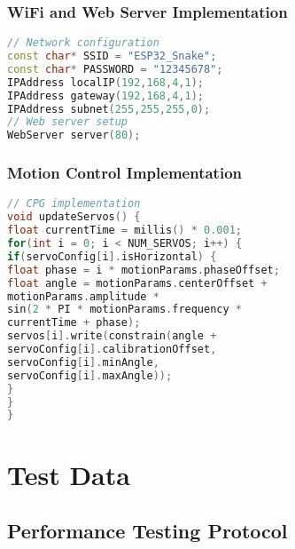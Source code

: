 \documentclass[12pt,a4paper]{report}
\begin{document}
\subsection{WiFi and Web Server Implementation}
\begin{lstlisting}[language=C++]
// Network configuration
const char* SSID = "ESP32_Snake";
const char* PASSWORD = "12345678";
IPAddress localIP(192,168,4,1);
IPAddress gateway(192,168,4,1);
IPAddress subnet(255,255,255,0);
// Web server setup
WebServer server(80);
\end{lstlisting}
\subsection{Motion Control Implementation}
\begin{lstlisting}[language=C++]
// CPG implementation
void updateServos() {
float currentTime = millis() * 0.001;
for(int i = 0; i < NUM_SERVOS; i++) {
if(servoConfig[i].isHorizontal) {
float phase = i * motionParams.phaseOffset;
float angle = motionParams.centerOffset +
motionParams.amplitude *
sin(2 * PI * motionParams.frequency *
currentTime + phase);
servos[i].write(constrain(angle +
servoConfig[i].calibrationOffset,
servoConfig[i].minAngle,
servoConfig[i].maxAngle));
}
}
}
\end{lstlisting}
\chapter{Test Data}
\section{Performance Testing Protocol}
\end{document}
